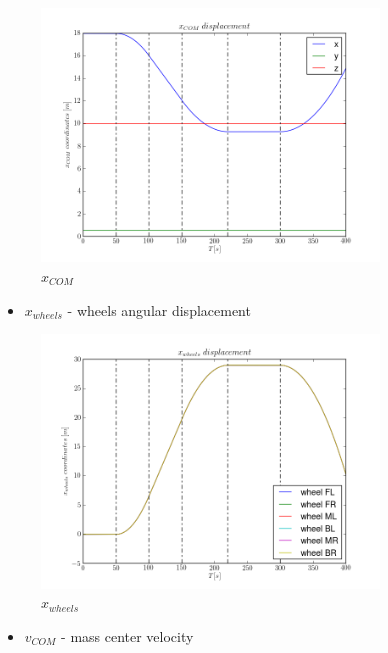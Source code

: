 \begin{figure}[H]
  \centering
    \includegraphics[width=0.8\textwidth]{xCOM3}
  \caption{$x_{COM}$}
\end{figure}

\begin{itemize}
  \item $x_{wheels}$ - wheels angular displacement 
\end{itemize}

\begin{figure}[H]
  \centering
    \includegraphics[width=0.8\textwidth]{xWHEELS3}
  \caption{$x_{wheels}$}
\end{figure}

\begin{itemize}
  \item $v_{COM}$ - mass center velocity
\end{itemize}

